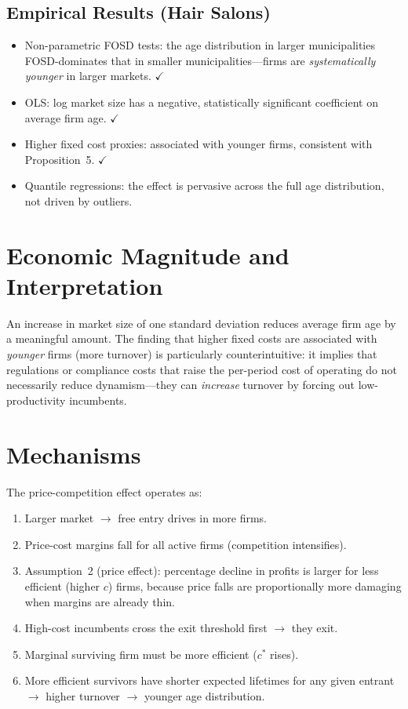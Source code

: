 \subsection*{Empirical Results (Hair Salons)}

\begin{itemize}
  \item Non-parametric FOSD tests: the age distribution in larger
    municipalities FOSD-dominates that in smaller municipalities---firms are
    \emph{systematically younger} in larger markets. $\checkmark$
  \item OLS: log market size has a negative, statistically significant
    coefficient on average firm age. $\checkmark$
  \item Higher fixed cost proxies: associated with younger firms,
    consistent with Proposition~5. $\checkmark$
  \item Quantile regressions: the effect is pervasive across the full
    age distribution, not driven by outliers.
\end{itemize}

\section{Economic Magnitude and Interpretation}

An increase in market size of one standard deviation reduces average firm age
by a meaningful amount. The finding that higher fixed costs are associated
with \emph{younger} firms (more turnover) is particularly counterintuitive:
it implies that regulations or compliance costs that raise the per-period cost
of operating do not necessarily reduce dynamism---they can \emph{increase}
turnover by forcing out low-productivity incumbents.

\section{Mechanisms}

The price-competition effect operates as:
\begin{enumerate}
  \item Larger market $\to$ free entry drives in more firms.
  \item Price-cost margins fall for all active firms (competition intensifies).
  \item Assumption~2 (price effect): percentage decline in profits is larger
    for less efficient (higher $c$) firms, because price falls are
    proportionally more damaging when margins are already thin.
  \item High-cost incumbents cross the exit threshold first $\to$ they exit.
  \item Marginal surviving firm must be more efficient ($c^*$ rises).
  \item More efficient survivors have shorter expected lifetimes for any
    given entrant $\to$ higher turnover $\to$ younger age distribution.
\end{enumerate}

